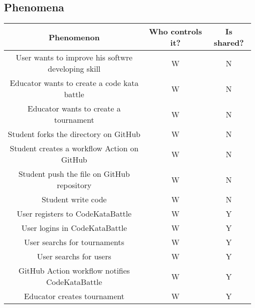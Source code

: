 \subsection{Phenomena}
\begin{center}
    \begin{table}[h]
        \begin{tabularx}{\textwidth}{| c| c| c|}
            \hline
            \rowcolor{blue!50}
            Phenomenon                                                            & Who controls it? & Is shared? \\
            \hline
            User wants to improve his softwre developing skill                    & W                & N          \\
            Educator wants to create a code kata battle                           & W                & N          \\
            Educator wants to create a tournament                                 & W                & N          \\
            Student forks the directory on GitHub                                 & W                & N          \\
            Student creates a workflow Action on GitHub                           & W                & N          \\
            Student push the file on GitHub repository                            & W                & N          \\
            Student write code                                                    & W                & N          \\
            User registers to CodeKataBattle                                      & W                & Y          \\
            User logins in CodeKataBattle                                         & W                & Y          \\
            User searchs for tournaments                                          & W                & Y          \\
            User searchs for users                                                & W                & Y          \\
            GitHub Action workflow notifies CodeKataBattle                        & W                & Y          \\
            Educator creates tournament                                           & W                & Y          \\

\end{tabularx}
\end{table}
\end{center}
